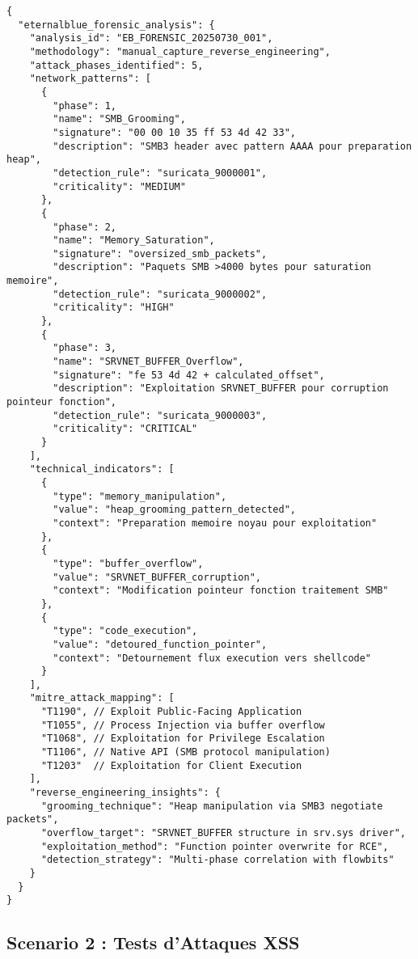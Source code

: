 \begin{lstlisting}[style=jsonstyle,caption=IOCs identifies par reverse engineering EternalBlue]
{
  "eternalblue_forensic_analysis": {
    "analysis_id": "EB_FORENSIC_20250730_001",
    "methodology": "manual_capture_reverse_engineering",
    "attack_phases_identified": 5,
    "network_patterns": [
      {
        "phase": 1,
        "name": "SMB_Grooming",
        "signature": "00 00 10 35 ff 53 4d 42 33",
        "description": "SMB3 header avec pattern AAAA pour preparation heap",
        "detection_rule": "suricata_9000001",
        "criticality": "MEDIUM"
      },
      {
        "phase": 2,
        "name": "Memory_Saturation", 
        "signature": "oversized_smb_packets",
        "description": "Paquets SMB >4000 bytes pour saturation memoire",
        "detection_rule": "suricata_9000002",
        "criticality": "HIGH"
      },
      {
        "phase": 3,
        "name": "SRVNET_BUFFER_Overflow",
        "signature": "fe 53 4d 42 + calculated_offset",
        "description": "Exploitation SRVNET_BUFFER pour corruption pointeur fonction",
        "detection_rule": "suricata_9000003", 
        "criticality": "CRITICAL"
      }
    ],
    "technical_indicators": [
      {
        "type": "memory_manipulation",
        "value": "heap_grooming_pattern_detected",
        "context": "Preparation memoire noyau pour exploitation"
      },
      {
        "type": "buffer_overflow",
        "value": "SRVNET_BUFFER_corruption",
        "context": "Modification pointeur fonction traitement SMB"
      },
      {
        "type": "code_execution",
        "value": "detoured_function_pointer", 
        "context": "Detournement flux execution vers shellcode"
      }
    ],
    "mitre_attack_mapping": [
      "T1190", // Exploit Public-Facing Application
      "T1055", // Process Injection via buffer overflow
      "T1068", // Exploitation for Privilege Escalation
      "T1106", // Native API (SMB protocol manipulation)
      "T1203"  // Exploitation for Client Execution
    ],
    "reverse_engineering_insights": {
      "grooming_technique": "Heap manipulation via SMB3 negotiate packets",
      "overflow_target": "SRVNET_BUFFER structure in srv.sys driver", 
      "exploitation_method": "Function pointer overwrite for RCE",
      "detection_strategy": "Multi-phase correlation with flowbits"
    }
  }
}
\end{lstlisting}

\subsection{Scenario 2 : Tests d{'}Attaques XSS}


